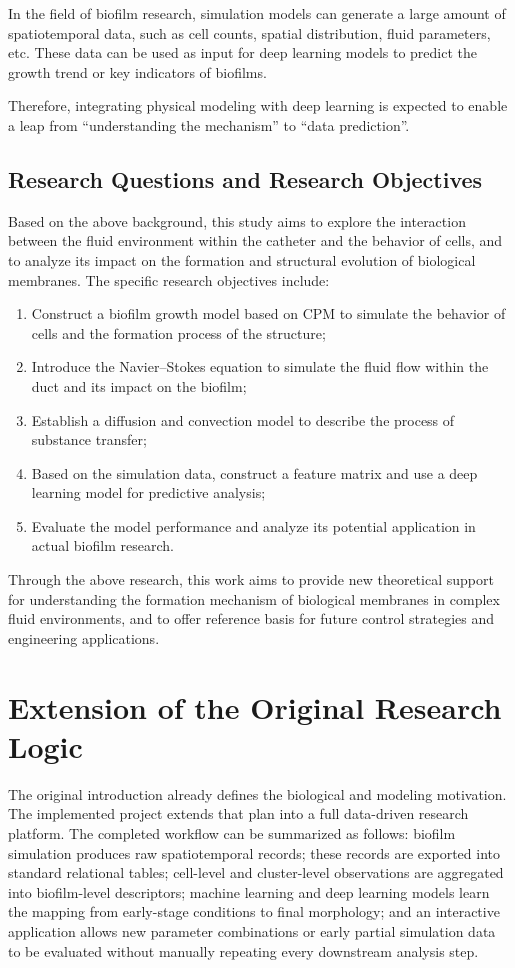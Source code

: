 \documentclass[12pt,a4paper,oneside]{report}
\begin{document}
In the field of biofilm research, simulation models can generate a large amount of spatiotemporal data, such as cell counts, spatial distribution, fluid parameters, etc. These data can be used as input for deep learning models to predict the growth trend or key indicators of biofilms.

Therefore, integrating physical modeling with deep learning is expected to enable a leap from ``understanding the mechanism'' to ``data prediction''.

\subsection{Research Questions and Research Objectives}
Based on the above background, this study aims to explore the interaction between the fluid environment within the catheter and the behavior of cells, and to analyze its impact on the formation and structural evolution of biological membranes. The specific research objectives include:

\begin{enumerate}[label=(\arabic*)]
\item Construct a biofilm growth model based on CPM to simulate the behavior of cells and the formation process of the structure;
\item Introduce the Navier--Stokes equation to simulate the fluid flow within the duct and its impact on the biofilm;
\item Establish a diffusion and convection model to describe the process of substance transfer;
\item Based on the simulation data, construct a feature matrix and use a deep learning model for predictive analysis;
\item Evaluate the model performance and analyze its potential application in actual biofilm research.
\end{enumerate}

Through the above research, this work aims to provide new theoretical support for understanding the formation mechanism of biological membranes in complex fluid environments, and to offer reference basis for future control strategies and engineering applications.

\section{Extension of the Original Research Logic}
The original introduction already defines the biological and modeling motivation. The implemented project extends that plan into a full data-driven research platform. The completed workflow can be summarized as follows: biofilm simulation produces raw spatiotemporal records; these records are exported into standard relational tables; cell-level and cluster-level observations are aggregated into biofilm-level descriptors; machine learning and deep learning models learn the mapping from early-stage conditions to final morphology; and an interactive application allows new parameter combinations or early partial simulation data to be evaluated without manually repeating every downstream analysis step.
\end{document}
